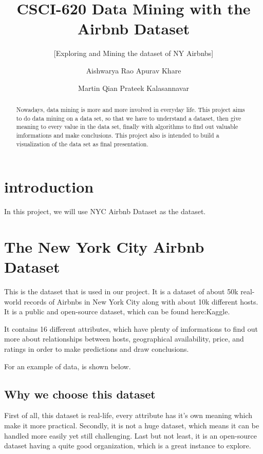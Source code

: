 \documentclass{sig-alternate}
\begin{document}
\title{CSCI-620 Data Mining with the Airbnb Dataset}
\subtitle{[Exploring and Mining the dataset of NY Airbnbs]}

\author
{
\alignauthor
  Aishwarya Rao
\alignauthor
  Apurav Khare
\and
\alignauthor
  Martin Qian
\alignauthor
  Prateek Kalasannavar
}

\maketitle
\begin{abstract}

Nowadays, data mining is more and more involved in everyday life. 
This project aims to do data mining on a data set, so that we have to understand a dataset, 
then give meaning to every value in the data set, finally with algorithms to find out valuable imformations and make conclusions. 
This project also is intended to build a visualization of the data set as final presentation.

\end{abstract}

\section{introduction}
In this project, we will use NYC Airbnb Dataset as the dataset. 

\section{The New York City Airbnb Dataset}
This is the dataset that is used in our project. It is a dataset 
of about 50k real-world records of Airbnbs in New York City along with about 10k different hosts. 
It is a public and open-source dataset, which can be found here:Kaggle{}.

It contains 16 different attributes, which have plenty of imformations to find out more about relationships between 
hosts, geographical availability, price, and ratings in order to make predictions and draw conclusions.

For an example of data, is shown below. 

\subsection{Why we choose this dataset}
First of all, this dataset is real-life, every attribute has it's own meaning which make it more practical. 
Secondly, it is not a huge dataset, which means it can be handled more easily yet still challenging. 
Last but not least, it is an open-source dataset having a quite good organization, which is a great instance to explore.
\end{document}
